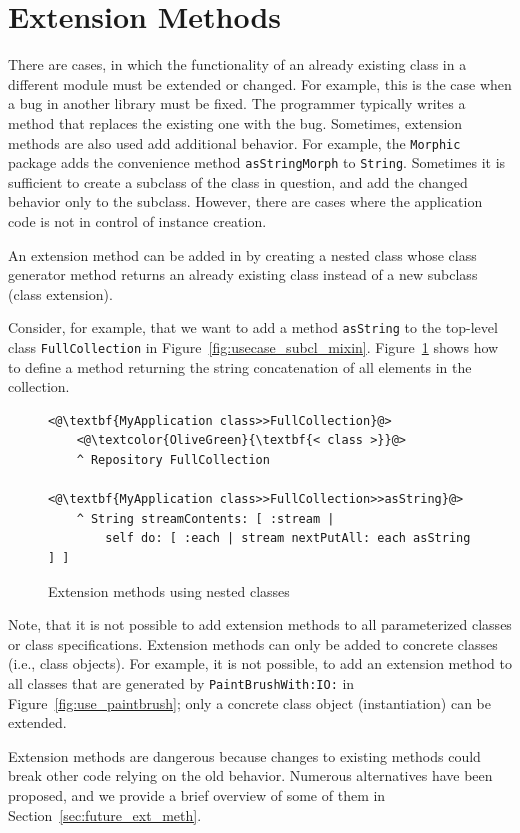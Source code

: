 \section{Extension Methods}
\label{sec:usecases_ext_meth}
There are cases, in which the functionality of an already existing class in a different module must be extended or changed. For example, this is the case when a bug in another library must be fixed. The programmer typically writes a method that replaces the existing one with the bug. Sometimes, extension methods are also used add additional behavior. For example, the \texttt{Morphic} package adds the convenience method \texttt{asStringMorph} to \texttt{String}. Sometimes it is sufficient to create a subclass of the class in question, and add the changed behavior only to the subclass. However, there are cases where the application code is not in control of instance creation.

An extension method can be added in \msname by creating a nested class whose class generator method returns an already existing class instead of a new subclass (class extension).

Consider, for example, that we want to add a method \texttt{asString} to the top-level class \texttt{FullCollection} in Figure~\ref{fig:usecase_subcl_mixin}. Figure~\ref{fig:use_ext_meth} shows how to define a method returning the string concatenation of all elements in the collection.

\begin{figure}[!htp]
\begin{lstlisting}
<@\textbf{MyApplication class>>FullCollection}@>
    <@\textcolor{OliveGreen}{\textbf{< class >}}@>
    ^ Repository FullCollection

<@\textbf{MyApplication class>>FullCollection>>asString}@>
    ^ String streamContents: [ :stream |
        self do: [ :each | stream nextPutAll: each asString ] ]
\end{lstlisting}
\caption{Extension methods using nested classes}
\label{fig:use_ext_meth}
\end{figure}

Note, that it is not possible to add extension methods to all parameterized classes or class specifications. Extension methods can only be added to concrete classes (i.e., class objects). For example, it is not possible, to add an extension method to all classes that are generated by \texttt{PaintBrushWith:IO:} in Figure~\ref{fig:use_paintbrush}; only a concrete class object (instantiation) can be extended.

Extension methods are dangerous because changes to existing methods could break other code relying on the old behavior. Numerous alternatives have been proposed, and we provide a brief overview of some of them in Section~\ref{sec:future_ext_meth}.
